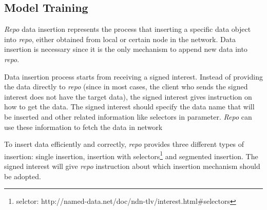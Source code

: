 \documentclass[conference]{IEEEtran}
\begin{document}
\subsection{Model Training}

\emph{Repo} data insertion represents the process that inserting a specific data object into \emph{repo}, either obtained from local or certain node in the network. Data insertion is necessary since it is the only mechanism to append new data into \emph{repo}.

Data insertion process starts from receiving a signed interest. Instead of providing the data directly to \emph{repo} (since in most cases, the client who sends the signed interest does not have the target data), the signed interest gives instruction on how to get the data. The signed interest should specify the data name that will be inserted and other related information like selectors in parameter. \emph{Repo} can use these information to fetch the data in network

To insert data efficiently and correctly, \emph{repo} provides three different types of insertion: single insertion, insertion with selectors\footnote{selctor: http://named-data.net/doc/ndn-tlv/interest.html\#selectors} and segmented insertion. The signed interest will give \emph{repo} instruction about which insertion mechanism should be adopted.
\end{document}
